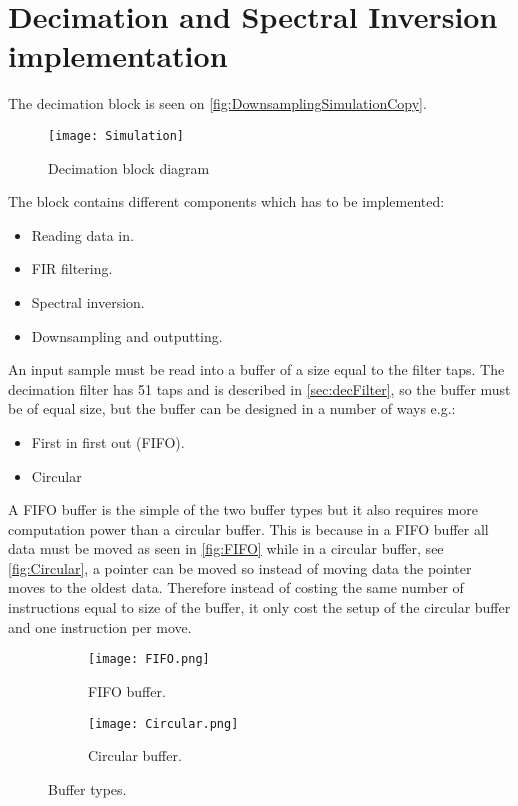 \section{Decimation and Spectral Inversion implementation} \label{sec:ImpFilterDEC}
The decimation block is seen on \autoref{fig:DownsamplingSimulationCopy}.
\begin{figure}[H]
    \centering
	\texttt{[image: Simulation]}
    \caption{Decimation block diagram}
    \label{fig:DownsamplingSimulationCopy}
\end{figure}
The block contains different components which has to be implemented:
\begin{itemize}
\item Reading data in.
\item FIR filtering.
\item Spectral inversion.
\item Downsampling and outputting. 
\end{itemize}
An input sample must be read into a buffer of a size equal to the filter taps. The decimation filter has 51 taps and is described in \autoref{sec:decFilter}, so the buffer must be of equal size, but the buffer can be designed in a number of ways e.g.:
\begin{itemize}
\item First in first out (FIFO).
\item Circular
\end{itemize} 
A FIFO buffer is the simple of the two buffer types but it also requires more computation power than a circular buffer. This is because in a FIFO buffer all data must be moved as seen in \autoref{fig:FIFO} while in a circular buffer, see \autoref{fig:Circular}, a pointer can be moved so instead of moving data the pointer moves to the oldest data. Therefore instead of costing the same number of instructions equal to size of the buffer, it only cost the setup of the circular buffer and one instruction per move.   
\begin{figure}[H]
\centering
\begin{subfigure}[t]{0.49\textwidth}
    \centering
	\texttt{[image: FIFO.png]}
	\caption{FIFO buffer.}
	\label{fig:FIFO}
\end{subfigure}
\begin{subfigure}[t]{0.49\textwidth}
    \centering
	\texttt{[image: Circular.png]}
	\caption{Circular buffer.}
	\label{fig:Circular}
\end{subfigure}
\caption{Buffer types.}
\label{fig:bufTypes}
\end{figure}
